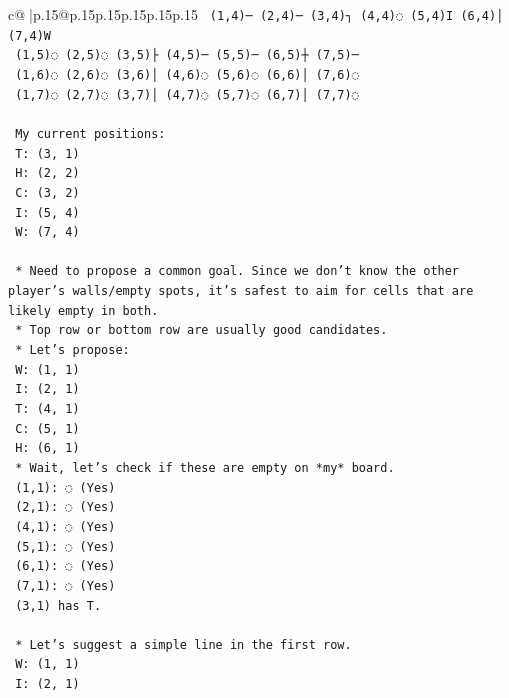 \documentclass{article}
\begin{document}
{\begin{supertabular}{c@{$\;$}|p{.15\linewidth}@{}p{.15\linewidth}p{.15\linewidth}p{.15\linewidth}p{.15\linewidth}p{.15\linewidth}}
{{{\texttt{            (1,4)─ (2,4)─ (3,4)┐ (4,4)◌ (5,4)I (6,4)│ (7,4)W} \\
\texttt{            (1,5)◌ (2,5)◌ (3,5)├ (4,5)─ (5,5)─ (6,5)┼ (7,5)─} \\
\texttt{            (1,6)◌ (2,6)◌ (3,6)│ (4,6)◌ (5,6)◌ (6,6)│ (7,6)◌} \\
\texttt{            (1,7)◌ (2,7)◌ (3,7)│ (4,7)◌ (5,7)◌ (6,7)│ (7,7)◌} \\
\\ 
\texttt{            My current positions:} \\
\texttt{            T: (3, 1)} \\
\texttt{            H: (2, 2)} \\
\texttt{            C: (3, 2)} \\
\texttt{            I: (5, 4)} \\
\texttt{            W: (7, 4)} \\
\\ 
\texttt{    *   Need to propose a common goal. Since we don't know the other player's walls/empty spots, it's safest to aim for cells that are likely empty in both.} \\
\texttt{    *   Top row or bottom row are usually good candidates.} \\
\texttt{    *   Let's propose:} \\
\texttt{        W: (1, 1)} \\
\texttt{        I: (2, 1)} \\
\texttt{        T: (4, 1)} \\
\texttt{        C: (5, 1)} \\
\texttt{        H: (6, 1)} \\
\texttt{    *   Wait, let's check if these are empty on *my* board.} \\
\texttt{        (1,1): ◌ (Yes)} \\
\texttt{        (2,1): ◌ (Yes)} \\
\texttt{        (4,1): ◌ (Yes)} \\
\texttt{        (5,1): ◌ (Yes)} \\
\texttt{        (6,1): ◌ (Yes)} \\
\texttt{        (7,1): ◌ (Yes)} \\
\texttt{        (3,1) has T.} \\
\\ 
\texttt{    *   Let's suggest a simple line in the first row.} \\
\texttt{        W: (1, 1)} \\
\texttt{        I: (2, 1)} \\
}}}
\end{supertabular}}
\end{document}
